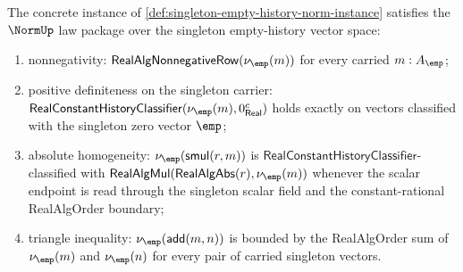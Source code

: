 \begin{theorem}
\label{thm:singleton-empty-history-norm-laws}
The concrete instance of
\autoref{def:singleton-empty-history-norm-instance} satisfies the $\NormUp$
law package over the singleton empty-history vector space:
\begin{enumerate}
  \item nonnegativity:
  $\mathsf{RealAlgNonnegativeRow}(\nu_{\emp}(m))$ for every carried
  $m:A_{\emp}$;
  \item positive definiteness on the singleton carrier:
  $\mathsf{RealConstantHistoryClassifier}(\nu_{\emp}(m),0_{\mathsf{Real}}^{c})$
  holds exactly on vectors classified with the singleton zero vector $\emp$;
  \item absolute homogeneity:
  $\nu_{\emp}(\mathsf{smul}(r,m))$ is
  $\mathsf{RealConstantHistoryClassifier}$-classified with
  $\mathsf{RealAlgMul}(\mathsf{RealAlgAbs}(r),\nu_{\emp}(m))$ whenever the
  scalar endpoint is read through the singleton scalar field and the
  constant-rational RealAlgOrder boundary;
  \item triangle inequality:
  $\nu_{\emp}(\mathsf{add}(m,n))$ is bounded by the RealAlgOrder sum of
  $\nu_{\emp}(m)$ and $\nu_{\emp}(n)$ for every pair of carried singleton
  vectors.
\end{enumerate}
\end{theorem}
